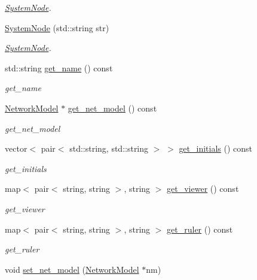 \begin{DoxyCompactItemize}
\begin{DoxyCompactList}\small\item\em \hyperlink{class_system_node}{System\+Node}. \end{DoxyCompactList}\item 
\hyperlink{class_system_node_a4aa5c984857fd4e24aa0ffee20ac39bd}{System\+Node} (std\+::string str)
\begin{DoxyCompactList}\small\item\em \hyperlink{class_system_node}{System\+Node}. \end{DoxyCompactList}\item 
std\+::string \hyperlink{class_system_node_ad7a4c3868f478f6815993fcd6b6ad58a}{get\+\_\+name} () const 
\begin{DoxyCompactList}\small\item\em get\+\_\+name \end{DoxyCompactList}\item 
\hyperlink{class_network_model}{Network\+Model} $\ast$ \hyperlink{class_system_node_abe191c2766e00f727d51f44c851ed34a}{get\+\_\+net\+\_\+model} () const 
\begin{DoxyCompactList}\small\item\em get\+\_\+net\+\_\+model \end{DoxyCompactList}\item 
vector$<$ pair$<$ std\+::string, std\+::string $>$ $>$ \hyperlink{class_system_node_a6cb062d7ff2ed4f60637e9a81285159f}{get\+\_\+initials} () const 
\begin{DoxyCompactList}\small\item\em get\+\_\+initials \end{DoxyCompactList}\item 
map$<$ pair$<$ string, string $>$, string $>$ \hyperlink{class_system_node_a80a53d4974112fbc141ff2b2c6e41e0c}{get\+\_\+viewer} () const 
\begin{DoxyCompactList}\small\item\em get\+\_\+viewer \end{DoxyCompactList}\item 
map$<$ pair$<$ string, string $>$, string $>$ \hyperlink{class_system_node_a83c7f77c040630cc4ba82ef7c8edca81}{get\+\_\+ruler} () const 
\begin{DoxyCompactList}\small\item\em get\+\_\+ruler \end{DoxyCompactList}\item 
void \hyperlink{class_system_node_a7c38ff77b75977b282166d3e96b15618}{set\+\_\+net\+\_\+model} (\hyperlink{class_network_model}{Network\+Model} $\ast$nm)

\end{DoxyCompactItemize}
